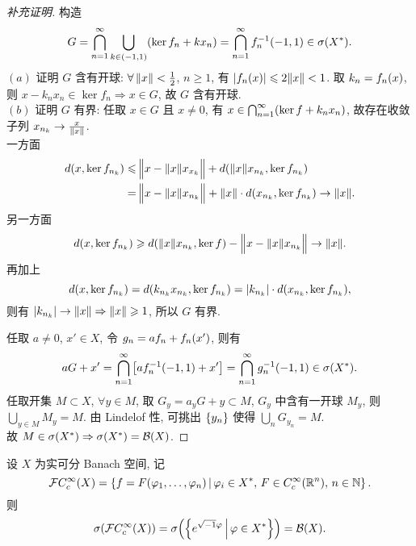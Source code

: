 \begin{proof}[补充证明]
构造
\[G=\bigcap_{n=1}^{\infty}\bigcup_{k\in\xk{-1,1}}\xk{\ker f_n+kx_n}=\bigcap_{n=1}^{\infty}f_n^{-1}\xk{-1,1}\in\sigma\xk{X^*}.\]
$(a)$ 证明 $G$ 含有开球: $\forall\,\fs{x}<\frac12$, $n\geq 1$, 有 $\jd{f_n\xk{x}}\leq 2\fs{x}<1$. 取 $k_n=f_n\xk{x}$, 则 $x-k_nx_n\in\ker f_n\Rightarrow x\in G$, 故 $G$ 含有开球.\\
$(b)$ 证明 $G$ 有界: 任取 $x\in G$ 且 $x\neq 0$, 有 $x\in\bigcap_{n=1}^{\infty}\xk{\ker f+k_nx_n}$, 故存在收敛子列 $x_{n_{k}}\to\frac{x}{\left\Vert x\right\Vert}$.\\
一方面
\begin{align*}
d\xk{x,\ker f_{n_{k}}}\leq &\,\Big\Vert x-\fs{x}x_{x_{k}}\Big\Vert+d\xk{\fs{x}x_{n_{k}},\ker f_{n_{k}}}\\
=&\,\Big\Vert x-\fs{x}x_{n_{k}}\Big\Vert+\fs{x}\cdot d\xk{x_{n_{k}},\ker f_{n_{k}}}\to\fs{x}.
\end{align*}
另一方面
\[d\xk{x,\ker f_{n_{k}}}\geq d\xk{\fs{x}x_{n_{k}},\ker f}-\Big\Vert x-\fs{x}x_{n_{k}}\Big\Vert\to\fs{x}.\]
再加上
\[d\xk{x,\ker f_{n_{k}}}=d\xk{k_{n_{k}}x_{n_{k}},\ker f_{n_{k}}}=\jd{k_{n_{k}}}\cdot d\xk{x_{n_{k}},\ker f_{n_{k}}},\]
则有 $\left\vert k_{n_{k}}\right\vert\to\left\Vert x\right\Vert\Rightarrow\left\Vert x\right\Vert\geqslant 1$, 所以 $G$ 有界.\par
任取 $a\neq 0$, $x'\in X$, 令 $g_n=af_n+f_n\xk{x'}$, 则有
\[aG+x'=\bigcap_{n=1}^{\infty}\zk{af_n^{-1}\xk{-1,1}+x'}=\bigcap_{n=1}^{\infty}g_n^{-1}\xk{-1,1}\in\sigma\xk{X^*}.\]
任取开集 $M\subset X$, $\forall y\in M$, 取 $G_y=a_y G+y\subset M$, $G_y$ 中含有一开球 $M_y$, 则 $\bigcup_{y\in M}M_y=M$. 由 Lindelof 性, 可挑出 $\left\{y_n\right\}$ 使得 $\bigcup_n G_{y_{n}}=M$.\\
故 $M\in\sigma\xk{X^*}\Rightarrow\sigma\xk{X^*}=\BB\xk{X}$.
\end{proof}
\begin{lemma}
设 $X$ 为实可分 Banach 空间, 记
\[\FF C_c^\infty\xk{X}=\jh{f=F\xk{\phi_1,\dots,\phi_n}}{\phi_i\in X^*,\,F\in C_c^\infty\xk{\rr^n},\,n\in\nn}.\]
则
\[\sigma\xk{\FF C_c^\infty\xk{X}}=\sigma\xk{\jh{e^{\xs\phi}}{\phi\in X^*}}=\BB\xk{X}.\]
\end{lemma}
